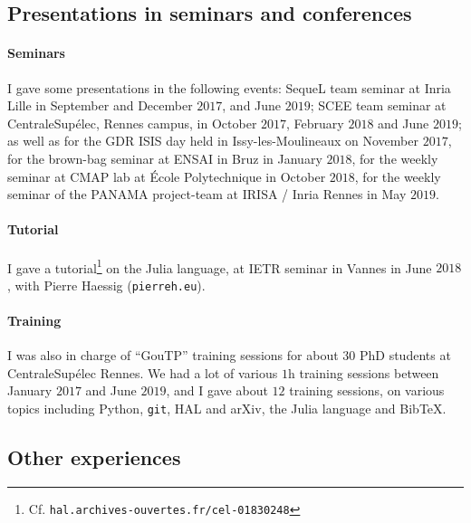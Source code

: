 \subsection{Presentations in seminars and conferences}

\paragraph{Seminars}
    I gave some presentations in the following events:
    SequeL team seminar at Inria Lille in September and December $2017$, and June $2019$;
    SCEE team seminar at CentraleSupélec, Rennes campus, in October $2017$, February $2018$ and June $2019$;
    as well as
    for the GDR ISIS day held in Issy-les-Moulineaux on November $2017$,
    for the brown-bag seminar at ENSAI in Bruz in January $2018$,
    for the weekly seminar at CMAP lab at École Polytechnique in October $2018$,
    for the weekly seminar of the PANAMA project-team at IRISA / Inria Rennes in May $2019$.

\paragraph{Tutorial}
    I gave a tutorial\footnote{Cf. \texttt{hal.archives-ouvertes.fr/cel-01830248}} on the Julia language, at IETR seminar in Vannes in June $2018$,
    with Pierre Haessig (\texttt{pierreh.eu}).

\paragraph{Training}
    I was also in charge of ``GouTP'' training sessions for about $30$ PhD students at CentraleSupélec Rennes.
    We had a lot of various $1$h training sessions between January $2017$ and June $2019$,
    and I gave about $12$ training sessions, on various topics including Python, \texttt{git}, HAL and arXiv, the Julia language and Bib\TeX{}.


\subsection{Other experiences}

